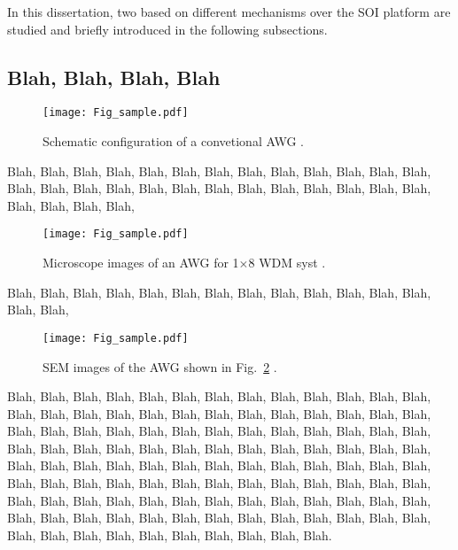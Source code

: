     In this dissertation, two  based on different mechanisms \cite{wdmf-awg-1, wdmf-awg-2, wdmf-awg-3, wdmf-awg-4, wdmf-awg-5, wdmf-awg-6, wdmf-awg-7, wdmf-wbg-1, wdmf-wbg-2, wdmf-wbg-3, cwdmf-awg-1, cwdmf-awg-2, cwdmf-awg-3, cwdmf-awg-4, cwdmf-awg-5, cwdmf-awgmzi-1, cwdmf-awgmzi-2, cwdmf-wbg-1, cwdmf-wbg-2, cwdmf-wbg-3, cwdmf-wbg-4, cwdmf-wbg-5, cwdmf-wbg-6} 
    over the SOI platform are studied and briefly introduced in the following subsections. 

\subsection{Blah, Blah, Blah, Blah} \label{sec:1.1.1}
    \begin{figure}[!h]
		\texttt{[image: Fig\_sample.pdf]}
		\centering
		\caption[Schematic configuration of a convetional AWG.]
            {\label{fig:1.1}Schematic configuration of a convetional AWG \cite{awg-fig-2}.}
	\end{figure}
    Blah, Blah, Blah, Blah, Blah, Blah, Blah, Blah, Blah, Blah, Blah, Blah, Blah, Blah, Blah, 
    Blah, Blah, Blah, Blah, Blah, Blah, Blah, Blah, Blah, Blah, Blah, Blah, Blah, Blah, Blah, 
    \begin{figure}[!t]
		\texttt{[image: Fig\_sample.pdf]}
		\centering
		\caption[Microscope images of an AWG for 1$\times$8 WDM syst]
            {\label{fig:1.2}Microscope images of an AWG for 1$\times$8 WDM syst \cite{awg-fig-2}.}
	\end{figure}
    Blah, Blah, Blah, Blah, Blah, Blah, Blah, Blah, Blah, Blah, Blah, Blah, Blah, Blah, Blah, 
    \begin{figure}[!t]
		\texttt{[image: Fig\_sample.pdf]}
		\centering
		\caption[SEM images of the AWG shown in Fig.~\ref{fig:1.2}]
            {\label{fig:1.3}SEM images of the AWG shown in Fig.~\ref{fig:1.2} \cite{awg-fig-2}.}
	\end{figure}
    Blah, Blah, Blah, Blah, Blah, Blah, Blah, Blah, Blah, Blah, Blah, Blah, Blah, Blah, Blah, Blah, Blah, Blah, Blah, 
    Blah, Blah, Blah, Blah, Blah, Blah, Blah, Blah, Blah, Blah, Blah, Blah, Blah, Blah, Blah, Blah, Blah, Blah, Blah, 
    Blah, Blah, Blah, Blah, Blah, Blah, Blah, Blah, Blah, Blah, Blah, Blah, Blah, Blah, Blah, Blah, Blah, Blah, Blah, 
    Blah, Blah, Blah, Blah, Blah, Blah, Blah, Blah, Blah, Blah, Blah, Blah, Blah, Blah, Blah, Blah, Blah, Blah, Blah, 
    Blah, Blah, Blah, Blah, Blah, Blah, Blah, Blah, Blah, Blah, Blah, Blah, Blah, Blah, Blah, Blah, Blah, Blah, Blah, 
    Blah, Blah, Blah, Blah, Blah, Blah, Blah, Blah, Blah, Blah, Blah, Blah, Blah, Blah, Blah, Blah, Blah, Blah, Blah.

